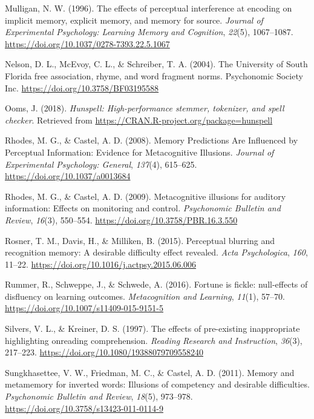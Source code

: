 \documentclass[english,doc]{apa6}
\begin{document}
\leavevmode\hypertarget{ref-Mulligan1996}{}%
Mulligan, N. W. (1996). The effects of perceptual interference at encoding on implicit memory, explicit memory, and memory for source. \emph{Journal of Experimental Psychology: Learning Memory and Cognition}, \emph{22}(5), 1067--1087. \url{https://doi.org/10.1037/0278-7393.22.5.1067}

\leavevmode\hypertarget{ref-Nelson2004}{}%
Nelson, D. L., McEvoy, C. L., \& Schreiber, T. A. (2004). The University of South Florida free association, rhyme, and word fragment norms. Psychonomic Society Inc. \url{https://doi.org/10.3758/BF03195588}

\leavevmode\hypertarget{ref-Ooms2018}{}%
Ooms, J. (2018). \emph{Hunspell: High-performance stemmer, tokenizer, and spell checker}. Retrieved from \url{https://CRAN.R-project.org/package=hunspell}

\leavevmode\hypertarget{ref-Rhodes2008}{}%
Rhodes, M. G., \& Castel, A. D. (2008). Memory Predictions Are Influenced by Perceptual Information: Evidence for Metacognitive Illusions. \emph{Journal of Experimental Psychology: General}, \emph{137}(4), 615--625. \url{https://doi.org/10.1037/a0013684}

\leavevmode\hypertarget{ref-Rhodes2009}{}%
Rhodes, M. G., \& Castel, A. D. (2009). Metacognitive illusions for auditory information: Effects on monitoring and control. \emph{Psychonomic Bulletin and Review}, \emph{16}(3), 550--554. \url{https://doi.org/10.3758/PBR.16.3.550}

\leavevmode\hypertarget{ref-Rosner2015}{}%
Rosner, T. M., Davis, H., \& Milliken, B. (2015). Perceptual blurring and recognition memory: A desirable difficulty effect revealed. \emph{Acta Psychologica}, \emph{160}, 11--22. \url{https://doi.org/10.1016/j.actpsy.2015.06.006}

\leavevmode\hypertarget{ref-Rummer2016}{}%
Rummer, R., Schweppe, J., \& Schwede, A. (2016). Fortune is fickle: null-effects of disfluency on learning outcomes. \emph{Metacognition and Learning}, \emph{11}(1), 57--70. \url{https://doi.org/10.1007/s11409-015-9151-5}

\leavevmode\hypertarget{ref-Silvers1997}{}%
Silvers, V. L., \& Kreiner, D. S. (1997). The effects of pre-existing inappropriate highlighting onreading comprehension. \emph{Reading Research and Instruction}, \emph{36}(3), 217--223. \url{https://doi.org/10.1080/19388079709558240}

\leavevmode\hypertarget{ref-Sungkhasettee2011}{}%
Sungkhasettee, V. W., Friedman, M. C., \& Castel, A. D. (2011). Memory and metamemory for inverted words: Illusions of competency and desirable difficulties. \emph{Psychonomic Bulletin and Review}, \emph{18}(5), 973--978. \url{https://doi.org/10.3758/s13423-011-0114-9}
\end{document}
